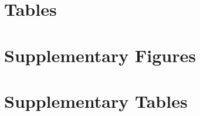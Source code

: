 \documentclass{article}
\newcommand{\beginsupplement}{%
        \setcounter{table}{0}
        \renewcommand{\thetable}{S\arabic{table}}%
        \setcounter{figure}{0}
        \renewcommand{\thefigure}{S\arabic{figure}}%
     }
\begin{document}
\pagebreak

\section*{Tables}



\pagebreak



	
\beginsupplement
	

%

\pagebreak

\section*{Supplementary Figures}



\pagebreak

\section*{Supplementary Tables}


\end{document}
